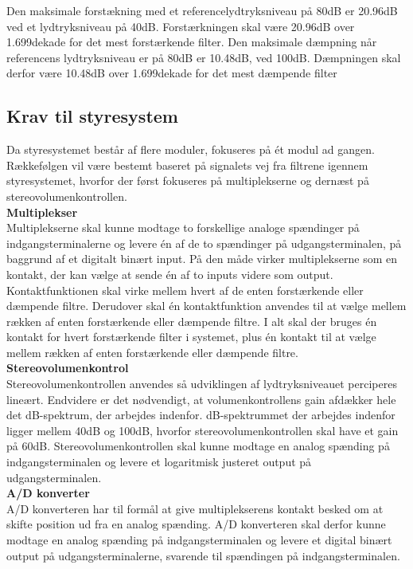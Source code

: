 Den maksimale forstækning med et referencelydtryksniveau på 80dB er 20.96dB ved et lydtryksniveau på 40dB. Forstærkningen skal være 20.96dB over 1.699dekade for det mest forstærkende filter. Den maksimale dæmpning når referencens lydtryksniveau er på 80dB er 10.48dB, ved 100dB. Dæmpningen skal derfor være 10.48dB over 1.699dekade for det mest dæmpende filter\\ 

\subsection{Krav til styresystem}
\label{Systemkrav_Styresystem}
%
Da styresystemet består af flere moduler, fokuseres på ét modul ad gangen. Rækkefølgen vil være bestemt baseret på signalets vej fra filtrene igennem styresystemet, hvorfor der først fokuseres på multiplekserne og dernæst på stereovolumenkontrollen.\\
\blankline	
\textbf{Multiplekser}\\
Multiplekserne skal kunne modtage to forskellige analoge spændinger på indgangsterminalerne og levere én af de to spændinger på udgangsterminalen, på baggrund af et digitalt binært input. På den måde virker multiplekserne som en kontakt, der kan vælge at sende én af to inputs videre som output. Kontaktfunktionen skal virke mellem hvert af de enten forstærkende eller dæmpende filtre. Derudover skal én kontaktfunktion anvendes til at vælge mellem rækken af enten forstærkende eller dæmpende filtre. I alt skal der bruges én kontakt for hvert forstærkende filter i systemet, plus én kontakt til at vælge mellem rækken af enten forstærkende eller dæmpende filtre.\\         
\blankline
%
\textbf{Stereovolumenkontrol}\\
Stereovolumenkontrollen anvendes så udviklingen af lydtryksniveauet perciperes lineært. Endvidere er det nødvendigt, at volumenkontrollens gain afdækker hele det dB-spektrum, der arbejdes indenfor. dB-spektrummet der arbejdes indenfor ligger mellem 40dB og 100dB, hvorfor stereovolumenkontrollen skal have et gain på 60dB. Stereovolumenkontrollen skal kunne modtage en analog spænding på indgangsterminalen og levere et logaritmisk justeret output på udgangsterminalen.\\
\blankline 
%
\textbf{A/D konverter}\\
A/D konverteren har til formål at give multiplekserens kontakt besked om at skifte position ud fra en analog spænding. A/D konverteren skal derfor kunne modtage en analog spænding på indgangsterminalen og levere et digital binært output på udgangsterminalerne, svarende til spændingen på indgangsterminalen. 
